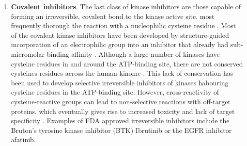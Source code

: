 \documentclass[11pt, b5paper,twoside]{tesi_upf}
\begin{document}
\begin{enumerate}
\item \textbf{Covalent inhibitors}. The last class of kinase inhibitors are those capable of forming an irreversible, covalent bond to the kinase active site, most frequently thorough the reaction with a nucleophilic cysteine residue \cite{Cohen2005}. Most of the covalent kinase inhibitors have been developed by structure-guided incorporation of an electrophilic group into an inhibitor that already had sub-micromolar binding affinity \cite{Potashman2009}. Although a large number of kinases have cysteine residues in and around the ATP-binding site, there are not conserved cysteines residues across the human kinome \cite{Liu2013a}. This lack of conservation has been used to develop selective irreversible inhibitors of kinases habouring cysteine residues in the ATP-binding site. However, cross-reactivity of cysteine-reactive groups can lead to non-selective reactions with off-target proteins, which eventually gives rise to increased toxicity and lack of target specificity \cite{Barf2012, Liebler2008}. Examples of FDA approved irreversible inhibitors include the Bruton's tyrosine kinase inhibitor (BTK) Ibrutinib or the EGFR inhibitor afatinib.
 
 
\end{enumerate}  
 
 
 
 
 

   
\end{document}

